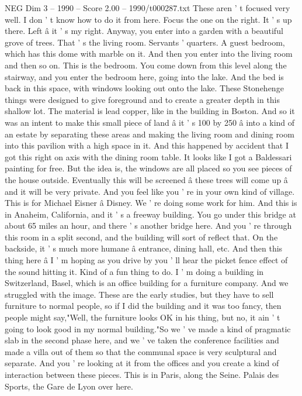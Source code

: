 \begin{textsample}{NEG Dim 3 – 1990 – Score 2.00 – 1990/t000287.txt}
These aren ' t focused very well.
I don ' t know how to do it from here.
Focus the one on the right.
It ' s up there.
Left â it ' s my right.
Anyway, you enter into a garden with a beautiful grove of trees.
That ' s the living room.
Servants ' quarters.
A guest bedroom, which has this dome with marble on it.
And then you enter into the living room and then so on.
This is the bedroom.
You come down from this level along the stairway, and you enter the bedroom here, going into the lake.
And the bed is back in this space, with windows looking out onto the lake.
These Stonehenge things were designed to give foreground and to create a greater depth in this shallow lot.
The material is lead copper, like in the building in Boston.
And so it was an intent to make this small piece of land â it ' s 100 by 250 â into a kind of an estate by separating these areas and making the living room and dining room into this pavilion with a high space in it.
And this happened by accident that I got this right on axis with the dining room table.
It looks like I got a Baldessari painting for free.
But the idea is, the windows are all placed so you see pieces of the house outside.
Eventually this will be screened â these trees will come up â and it will be very private.
And you feel like you ' re in your own kind of village.
This is for Michael Eisner â Disney.
We ' re doing some work for him.
And this is in Anaheim, California, and it ' s a freeway building.
You go under this bridge at about 65 miles an hour, and there ' s another bridge here.
And you ' re through this room in a split second, and the building will sort of reflect that.
On the backside, it ' s much more humane â entrance, dining hall, etc.
And then this thing here â I ' m hoping as you drive by you ' ll hear the picket fence effect of the sound hitting it.
Kind of a fun thing to do.
I ' m doing a building in Switzerland, Basel, which is an office building for a furniture company.
And we struggled with the image.
These are the early studies, but they have to sell furniture to normal people, so if I did the building and it was too fancy, then people might say,"Well, the furniture looks OK in his thing, but no, it ain ' t going to look good in my normal building."So we ' ve made a kind of pragmatic slab in the second phase here, and we ' ve taken the conference facilities and made a villa out of them so that the communal space is very sculptural and separate.
And you ' re looking at it from the offices and you create a kind of interaction between these pieces.
This is in Paris, along the Seine.
Palais des Sports, the Gare de Lyon over here.

\end{textsample}
